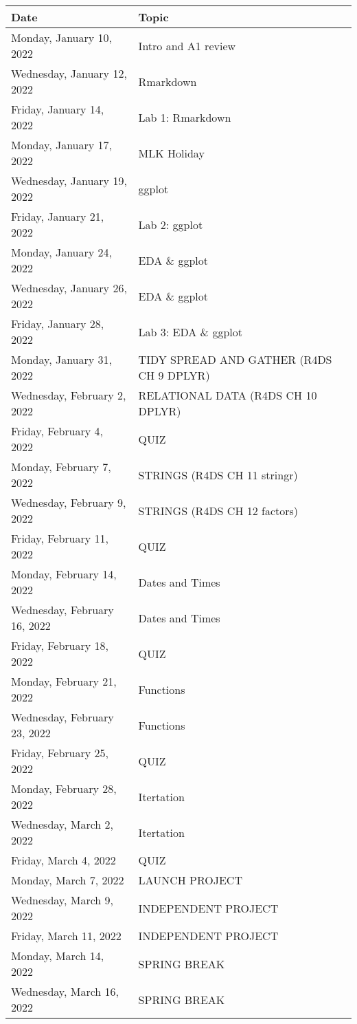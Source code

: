 \documentclass[
]{book}
\begin{document}
\begin{longtable}[]{@{}ll@{}}
\toprule
Date & Topic \\
\midrule
\endhead
Monday, January 10, 2022 & Intro and A1 review \\
Wednesday, January 12, 2022 & Rmarkdown \\
Friday, January 14, 2022 & Lab 1: Rmarkdown \\
Monday, January 17, 2022 & MLK Holiday \\
Wednesday, January 19, 2022 & ggplot \\
Friday, January 21, 2022 & Lab 2: ggplot \\
Monday, January 24, 2022 & EDA \& ggplot \\
Wednesday, January 26, 2022 & EDA \& ggplot \\
Friday, January 28, 2022 & Lab 3: EDA \& ggplot \\
Monday, January 31, 2022 & TIDY SPREAD AND GATHER (R4DS CH 9 DPLYR) \\
Wednesday, February 2, 2022 & RELATIONAL DATA (R4DS CH 10 DPLYR) \\
Friday, February 4, 2022 & QUIZ \\
Monday, February 7, 2022 & STRINGS (R4DS CH 11 stringr) \\
Wednesday, February 9, 2022 & STRINGS (R4DS CH 12 factors) \\
Friday, February 11, 2022 & QUIZ \\
Monday, February 14, 2022 & Dates and Times \\
Wednesday, February 16, 2022 & Dates and Times \\
Friday, February 18, 2022 & QUIZ \\
Monday, February 21, 2022 & Functions \\
Wednesday, February 23, 2022 & Functions \\
Friday, February 25, 2022 & QUIZ \\
Monday, February 28, 2022 & Itertation \\
Wednesday, March 2, 2022 & Itertation \\
Friday, March 4, 2022 & QUIZ \\
Monday, March 7, 2022 & LAUNCH PROJECT \\
Wednesday, March 9, 2022 & INDEPENDENT PROJECT \\
Friday, March 11, 2022 & INDEPENDENT PROJECT \\
Monday, March 14, 2022 & SPRING BREAK \\
Wednesday, March 16, 2022 & SPRING BREAK \\

\end{longtable}
\end{document}
